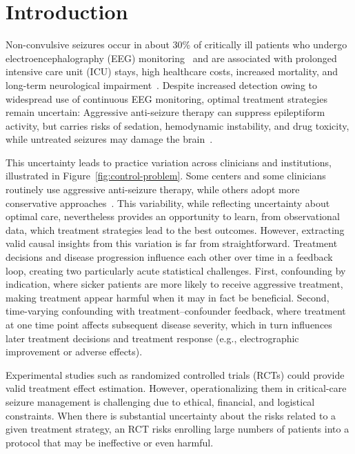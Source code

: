 \section{Introduction}

Non-convulsive seizures occur in about 30\% of critically ill patients who undergo electroencephalography (EEG) monitoring~\cite{hirsch2021american} and are associated with  prolonged intensive care unit (ICU) stays, high healthcare costs, increased mortality, and long-term neurological impairment~\cite{rodriguez2017association,vespa2005continuous,westover2015probability}. Despite increased detection owing to widespread use of continuous EEG monitoring, optimal treatment strategies remain uncertain: Aggressive anti-seizure therapy can suppress epileptiform activity, but carries risks of sedation, hemodynamic instability, and drug toxicity, while untreated seizures may damage the brain~\cite{lalgudi2019electrographic, demarchis2016seizure, payne2014seizure, zafar2018effect, rossetti2005refractory, muhlhofer2019duration, marchi2015status, an2018variability, sutter2016status, abend2015critical}. 

This uncertainty leads to practice variation across clinicians and institutions, illustrated in Figure~\ref{fig:control-problem}. Some centers and some clinicians routinely use aggressive anti-seizure therapy, while others adopt more conservative approaches~\cite{chong2005which, rubinos2018ictal, osman2018ictal, johnson2017population, tao2020ictal, cormier2017ictal}. This variability, while reflecting uncertainty about optimal care, nevertheless provides an opportunity to learn, from observational data, which treatment strategies lead to the best outcomes. However, extracting valid causal insights from this variation is far from straightforward. Treatment decisions and disease progression influence each other over time in a feedback loop, creating two particularly acute statistical challenges. First, confounding by indication, where sicker patients are more likely to receive aggressive treatment, making treatment appear harmful when it may in fact be beneficial. Second, time-varying confounding with treatment–confounder feedback, where treatment at one time point affects subsequent disease severity, which in turn influences later treatment decisions and treatment response (e.g., electrographic improvement or adverse effects).

Experimental studies such as randomized controlled trials (RCTs) could provide valid treatment effect estimation. However, operationalizing them in critical-care seizure management is challenging due to ethical, financial, and logistical constraints. When there is substantial uncertainty about the risks related to a given treatment strategy, an RCT risks enrolling large numbers of patients into a protocol that may be ineffective or even harmful.


